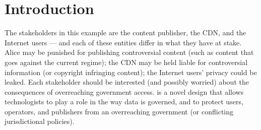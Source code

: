 \section{Introduction}
\label{sec:intro}

The stakeholders in this 
example are the content publisher, the CDN, and the Internet users --- and each of these entities differ in what 
they have at stake.  Alice may be punished for publishing controversial content (such as content that 
goes against the current regime); the CDN 
may be held liable for controversial information (or copyright infringing content); the Internet users' 
privacy could be leaked.  Each stakeholder should be interested (and possibly worried) about the 
consequences of overreaching government access.  \system{} is a novel design that allows technologists to play 
a role in the way data is governed, and to protect users, operators, and publishers from an overreaching government (or 
conflicting jurisdictional policies).
